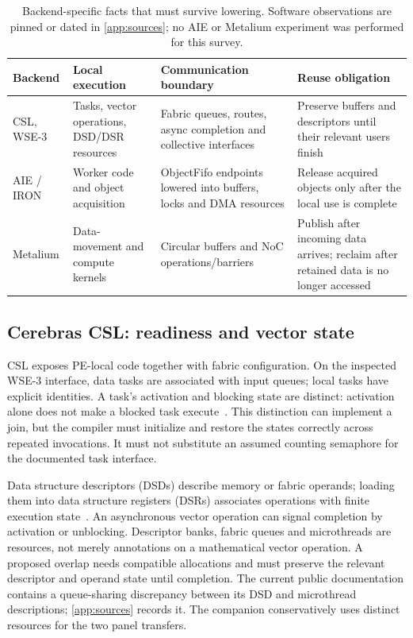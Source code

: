 \documentclass[final,3p,times,authoryear]{elsarticle}
\begin{document}
\begin{table}[t]
\caption{Backend-specific facts that must survive lowering. Software observations are pinned or dated in \ref{app:sources}; no AIE or Metalium experiment was performed for this survey.}
\label{tab:backends}
\small
\begin{tabularx}{\linewidth}{@{}>{\raggedright\arraybackslash}p{1.6cm}XXX@{}}
\toprule
Backend & Local execution & Communication boundary & Reuse obligation \\
\midrule
CSL, WSE-3 & Tasks, vector operations, DSD/DSR resources & Fabric queues, routes, async completion and collective interfaces & Preserve buffers and descriptors until their relevant users finish \\
AIE / IRON & Worker code and object acquisition & ObjectFifo endpoints lowered into buffers, locks and DMA resources & Release acquired objects only after the local use is complete \\
Metalium & Data-movement and compute kernels & Circular buffers and NoC operations/barriers & Publish after incoming data arrives; reclaim after retained data is no longer accessed \\
\bottomrule
\end{tabularx}
\end{table}

\subsection{Cerebras CSL: readiness and vector state}
CSL exposes PE-local code together with fabric configuration. On the inspected WSE-3 interface, data tasks are associated with input queues; local tasks have explicit identities. A task's activation and blocking state are distinct: activation alone does not make a blocked task execute~\citep{csltasks2026}. This distinction can implement a join, but the compiler must initialize and restore the states correctly across repeated invocations. It must not substitute an assumed counting semaphore for the documented task interface.

Data structure descriptors (DSDs) describe memory or fabric operands; loading them into data structure registers (DSRs) associates operations with finite execution state~\citep{csldsd2026}. An asynchronous vector operation can signal completion by activation or unblocking. Descriptor banks, fabric queues and microthreads are resources, not merely annotations on a mathematical vector operation. A proposed overlap needs compatible allocations and must preserve the relevant descriptor and operand state until completion. The current public documentation contains a queue-sharing discrepancy between its DSD and microthread descriptions; \ref{app:sources} records it. The companion conservatively uses distinct resources for the two panel transfers.
\end{document}
